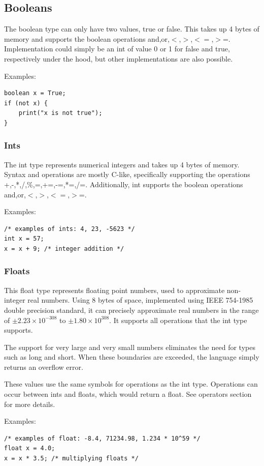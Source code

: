 \documentclass{article}
\begin{document}
\subsection{Booleans}
The boolean type can only have two values, true or false. This takes up 4 bytes of memory and supports the boolean operations and,or,$<$,$>$,$<=$,$>$=. Implementation could simply be an int of value 0 or 1 for false and true, respectively under the hood, but other implementations are also possible. 

Examples:

\begin{lstlisting}
boolean x = True;
if (not x) {
	print("x is not true");
}
\end{lstlisting}
\subsubsection{Ints}
The int type represents numerical integers and takes up 4 bytes of memory. Syntax and operations are mostly C-like, specifically supporting the operations
+,-,*,/,\%,=,+=,-=,*=,/=. Additionally, int supports the boolean operations and,or,$<$,$>$,$<=$,$>$=.

Examples: 

\begin{lstlisting}
/* examples of ints: 4, 23, -5623 */
int x = 57;
x = x + 9; /* integer addition */
\end{lstlisting}
\subsubsection{Floats}
This float type represents floating point numbers, used to approximate non-integer real numbers. Using 8 bytes of space, implemented using IEEE 754-1985 double precision standard, it can precisely approximate real numbers in the range of $\pm 2.23\times 10^{-308}$ to $\pm 1.80\times 10^{308}$. It supports all operations that the int type supports.

The support for very large and very small numbers eliminates the need for types such as long and short. When these boundaries are exceeded, the language simply returns an overflow error.

These values use the same symbols for operations as the int type. Operations can occur between ints and floats, which would return a float. See operators section for more details.

Examples:

\begin{lstlisting}
/* examples of float: -8.4, 71234.98, 1.234 * 10^59 */
float x = 4.0;
x = x * 3.5; /* multiplying floats */
\end{lstlisting}
\end{document}
